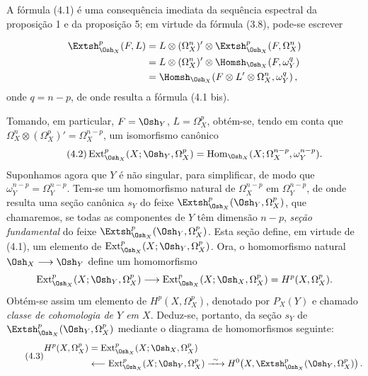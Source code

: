 A fórmula (4.1) é uma consequência imediata da sequência espectral da
proposição 1 e da proposição 5; em virtude da fórmula (3.8), pode-se
escrever

\begin{align*}
\Extsh_{\Osh_X}^{p}(F,L)
&=L\otimes(\Omega_X^{n})'\otimes
  \Extsh_{\Osh_X}^{p}(F,\Omega_X^{n})\\
&=L\otimes(\Omega_X^{n})'\otimes
  \Homsh_{\Osh_X}(F,\omega_Y^{q})\\
&=\Homsh_{\Osh_X}\!\left(
  F\otimes L'\otimes\Omega_X^{n},\omega_Y^{q}\right),
\end{align*}
onde $q=n-p$, de onde resulta a fórmula (4.1 bis).

Tomando, em particular, $F=\Osh_Y$, $L=\Omega_X^{p}$, obtém-se, tendo em conta
que $\Omega_X^{n}\otimes(\Omega_X^{p})'=\Omega_X^{n-p}$, um isomorfismo
canônico
\begin{equation}\tag{4.2}
  \operatorname{Ext}_{\Osh_X}^{p}(X;\Osh_Y,\Omega_X^{p})
  =\operatorname{Hom}_{\Osh_X}
  (X;\Omega_X^{n-p},\omega_Y^{n-p}).
\end{equation}
Suponhamos agora que $Y$ é não singular, para simplificar, de modo que
$\omega_Y^{n-p}=\Omega_Y^{n-p}$. Tem-se um homomorfismo natural de
$\Omega_X^{n-p}$ em $\Omega_Y^{n-p}$, de onde resulta uma seção canônica $s_Y$ do
feixe $\Extsh_{\Osh_X}^{p}(\Osh_Y,\Omega_X^{p})$, que chamaremos, se
todas as componentes de $Y$ têm dimensão $n-p$, \emph{seção
fundamental} do feixe $\Extsh_{\Osh_X}^{p}(\Osh_Y,\Omega_X^{p})$. Esta
seção define, em virtude de (4.1), um elemento de
$\operatorname{Ext}_{\Osh_X}^{p}(X;\Osh_Y,\Omega_X^{p})$. Ora, o homomorfismo
natural $\Osh_X\longrightarrow\Osh_Y$ define um homomorfismo
\[
  \operatorname{Ext}_{\Osh_X}^{p}(X;\Osh_Y,\Omega_X^{p})
  \longrightarrow
  \operatorname{Ext}_{\Osh_X}^{p}(X;\Osh_X,\Omega_X^{p})
  =H^{p}(X,\Omega_X^{p}).
\]
Obtém-se assim um elemento de $H^{p}(X,\Omega_X^{p})$, denotado por $P_X(Y)$ e chamado
\emph{classe de cohomologia de $Y$ em $X$}. Deduz-se, portanto, da seção
$s_Y$ de $\Extsh_{\Osh_X}^{p}(\Osh_Y,\Omega_X^{p})$ mediante o diagrama
de homomorfismos seguinte:
\begin{equation}\tag{4.3}
\begin{aligned}
H^{p}(X,\Omega_X^{p})
&=\operatorname{Ext}_{\Osh_X}^{p}(X;\Osh_X,\Omega_X^{p})\\
&\longleftarrow\operatorname{Ext}_{\Osh_X}^{p}(X;\Osh_Y,\Omega_X^{p})
\xrightarrow{\ \sim\ }
H^{0}\!\left(X,\Extsh_{\Osh_X}^{p}(\Osh_Y,\Omega_X^{p})\right).
\end{aligned}
\end{equation}

